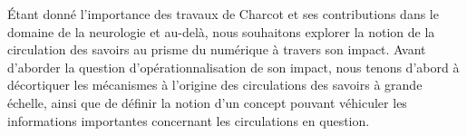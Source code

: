 Étant donné l'importance des travaux de Charcot et ses contributions dans le domaine de la neurologie et au-delà, nous souhaitons explorer la notion de la circulation des savoirs au prisme du numérique à travers son impact. Avant d'aborder la question d'opérationnalisation de son impact, nous tenons d'abord à décortiquer les mécanismes à l'origine des circulations des savoirs à grande échelle, ainsi que de définir la notion d'un \og{}concept\fg{} pouvant véhiculer les informations importantes concernant les circulations en question.  
